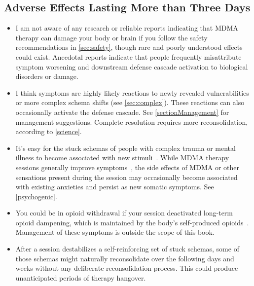 \documentclass[11pt,oneside]{book}
\let\cite\parencite
\begin{document}
\subsection{Adverse Effects Lasting More than Three Days}
\begin{itemize}
    \item I am not aware of any research or reliable reports indicating that MDMA therapy can damage your body or brain if you follow the safety recommendations in \cref{sec:safety}, though rare and poorly understood effects could exist. Anecdotal reports indicate that people frequently misattribute symptom worsening and downstream defense cascade activation to biological disorders or damage.
    \item I think symptoms are highly likely reactions to newly revealed vulnerabilities or more complex schema shifts (see \cref{sec:complex}). These reactions can also occasionally activate the defense cascade. See \cref{sectionManagement} for management suggestions. Complete resolution requires more reconsolidation, according to \cref{science}.
    \item It's easy for the stuck schemas of people with complex trauma or mental illness to become associated with new stimuli~\cite{berghBSTS}. While MDMA therapy sessions generally improve symptoms~\cite{mitchellMDMAClinicalTrial,mitchellMDMAClinicalTrial2}, the side effects of MDMA or other sensations present during the session may occasionally become associated with existing anxieties and persist as new somatic symptoms. See \cref{psychogenic}.
    \item You could be in opioid withdrawal if your session deactivated long-term opioid dampening, which is maintained by the body's self-produced opioids~\cite{laniusNeurobiology}. Management of these symptoms is outside the scope of this book.
    \item After a session destabilizes a self-reinforcing set of stuck schemas, some of those schemas might naturally reconsolidate over the following days and weeks without any deliberate reconsolidation process. This could produce unanticipated periods of therapy hangover.
\end{itemize}
\end{document}
